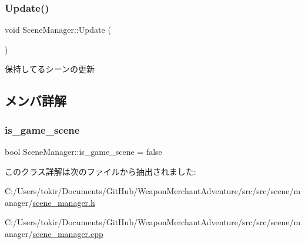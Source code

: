\subsubsection{\texorpdfstring{Update()}{Update()}}
{\footnotesize\ttfamily void Scene\+Manager\+::\+Update (\begin{DoxyParamCaption}{ }\end{DoxyParamCaption})}



保持してるシーンの更新 



\subsection{メンバ詳解}
\mbox{\label{class_scene_manager_a416645f4b11ce8cdb81d9d43d1c5666b}} 
\subsubsection{\texorpdfstring{is\+\_\+game\+\_\+scene}{is\_game\_scene}}
{\footnotesize\ttfamily bool Scene\+Manager\+::is\+\_\+game\+\_\+scene = false}



このクラス詳解は次のファイルから抽出されました\+:\begin{DoxyCompactItemize}
\item 
C\+:/\+Users/tokir/\+Documents/\+Git\+Hub/\+Weapon\+Merchant\+Adventure/src/src/scene/manager/\mbox{\hyperlink{scene__manager_8h}{scene\+\_\+manager.\+h}}\item 
C\+:/\+Users/tokir/\+Documents/\+Git\+Hub/\+Weapon\+Merchant\+Adventure/src/src/scene/manager/\mbox{\hyperlink{scene__manager_8cpp}{scene\+\_\+manager.\+cpp}}\end{DoxyCompactItemize}
